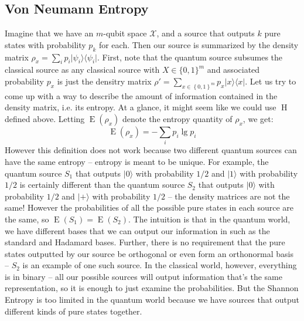 \documentclass[11pt]{article}
\newcommand{\set}[1]{\left\{ #1 \right\}}
\newcommand{\se}{\operatorname{H}}
\newcommand{\e}{\operatorname{E}}
\newcommand{\bra}[1]{\langle #1 \rvert}
\newcommand{\ket}[1]{\lvert #1 \rangle}
\newcommand{\kret}[2]{\ket{#1}\bra{#2}}
\newcommand{\kera}[1]{\kret{#1}{#1}}
\def\X{\mathcal{X}}
\def\fill{   \hfill}
\begin{document}
\subsection{Von Neumann Entropy}
Imagine that we have an $m$-qubit space $\X$, and a source that outputs $k$ pure states with probability $p_k$ for each. Then our source is summarized by the density matrix $\rho_x = \sum_{i} p_i \kera{\psi_i}$. First, note that the quantum source subsumes the classical source as any classical source with $X \in \{0, 1\}^m$ and associated probability $p_x$ is just the densitry matrix $\rho' = \sum_{x \in \set{0, 1}^m} p_x \kera{x}$. %
Let us try to come up with a way to describe the amount of information contained in the density matrix, i.e. its entropy. At a glance, it might seem like we could use $\se$ defined above. Letting $\e(\rho_x)$ denote the entropy quantity of $\rho_x$, we get:
\begin{equation*}
\e(\rho_x) = -\sum_{i} p_i \lg{p_i}
\end{equation*} 
However this definition does not work because two different quantum sources can have the same entropy -- entropy is meant to be unique. For example, the quantum source $S_1$ that outputs $\ket{0}$ with probability $1/2$ and $\ket{1}$ with probability $1/2$ is certainly different than the quantum source $S_2$ that outputs $\ket{0}$ with probability $1/2$ and $\ket{+}$ with probability $1/2$ -- the density matrices are not the same! However the probabilities of all the possible pure states in each source are the same, so $\e(S_1) = \e(S_2)$. The intuition is that in the quantum world, we have different bases that we can output our information in such as the standard and Hadamard bases. Further, there is no requirement that the pure states outputted by our source be orthogonal or even form an orthonormal basis -- $S_2$ is an example of one such source. In the classical world, however, everything is in binary -- all our possible sources will output information that's the same representation, so it is enough to just examine the probabilities. But the Shannon Entropy is too limited in the quantum world because we have sources that output different kinds of pure states together.

\fill
\end{document}
